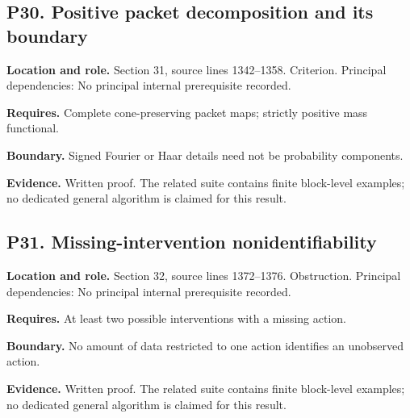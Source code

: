 \documentclass[11pt,letterpaper]{article}
\begin{document}
\par\noindent\begin{minipage}{\textwidth}
\subsection{P30. Positive packet decomposition and its
boundary}\label{p30.-positive-packet-decomposition-and-its-boundary}

\textbf{Location and role.} Section 31, source lines 1342--1358.
Criterion. Principal dependencies: No principal internal prerequisite
recorded.

\textbf{Requires.} Complete cone-preserving packet maps; strictly
positive mass functional.

\textbf{Boundary.} Signed Fourier or Haar details need not be
probability components.

\textbf{Evidence.} Written proof. The related suite contains finite
block-level examples; no dedicated general algorithm is claimed for this
result.
\end{minipage}\par\medskip

\par\noindent\begin{minipage}{\textwidth}
\subsection{P31. Missing-intervention
nonidentifiability}\label{p31.-missing-intervention-nonidentifiability}

\textbf{Location and role.} Section 32, source lines 1372--1376.
Obstruction. Principal dependencies: No principal internal prerequisite
recorded.

\textbf{Requires.} At least two possible interventions with a missing
action.

\textbf{Boundary.} No amount of data restricted to one action identifies
an unobserved action.

\textbf{Evidence.} Written proof. The related suite contains finite
block-level examples; no dedicated general algorithm is claimed for this
result.
\end{minipage}\par\medskip
\end{document}
